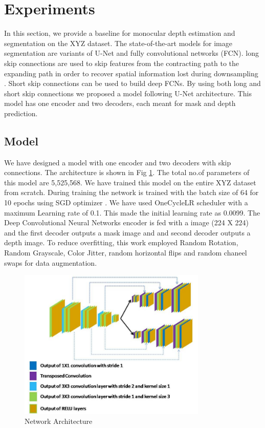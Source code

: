 \documentclass[review]{cvpr}
\begin{document}
\section{Experiments}
In this section, we provide a baseline for monocular depth estimation and segmentation on the XYZ dataset. 
The state-of-the-art models for image segmentation are variants of U-Net and fully convolutional networks (FCN)\cite{drozdzal2016importance}. 
long skip connections are used to skip features from the contracting path to the expanding path in order to recover 
spatial information lost during downsampling \cite{zhou2019unet++}. Short skip connections can be used to build deep FCNs. 
By using both long and short skip connections we proposed a model following U-Net architecture. 
This model has one encoder and two decoders, each meant for mask and depth prediction.
\subsection{Model}
We have designed a model with one encoder and two decoders with skip connections. 
The architecture is shown in Fig \ref{fig:modelarch}. The total no.of parameters of this model are 5,525,568. 
We have trained this model on the entire XYZ dataset from scratch. 
During training the network is trained with the batch size of 64 for 10 epochs using SGD optimizer \cite{bottou2010large}. 
We have used OneCycleLR scheduler \cite{smith2018disciplined} with a maximum Learning rate of 0.1. 
This made the initial learning rate as 0.0099.
The Deep Convolutional Neural Networks encoder is fed with a image (224 X 224) and the first decoder outputs a mask 
image and and second decoder outputs a depth image. To reduce overfitting\cite{perez2017effectiveness}, 
this work employed Random Rotation, Random Grayscale, Color Jitter, random horizontal flips and random chaneel swaps for data augmentation.

\begin{figure}
\centering
  \includegraphics[width=0.8\textwidth]{networkarchitecture.jpg}
  \caption{Network Architecture}
  \label{fig:modelarch}
\end{figure}
\end{document}
